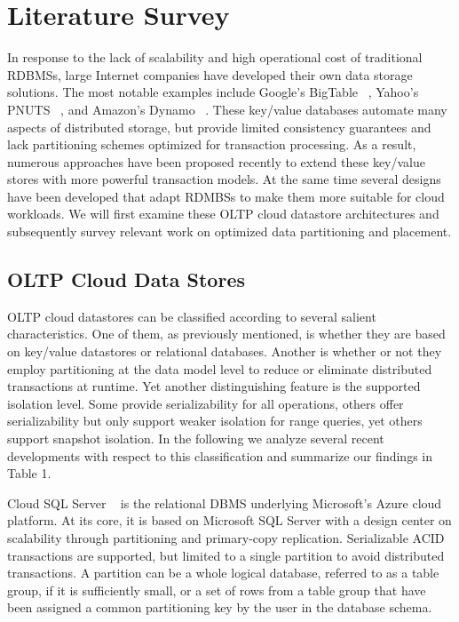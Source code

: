 \documentclass[10pt,final,journal]{IEEEtran}
\begin{document}
\section{Literature Survey}
In response to the lack of scalability and high operational cost of traditional RDBMSs, large Internet companies have developed their own data storage solutions. The most notable examples include Google's BigTable ~\cite{Chang:2006:BDS:1267308.1267323}, Yahoo's PNUTS ~\cite{Cooper:2008:PYH:1454159.1454167}, and Amazon's Dynamo ~\cite{DeCandia:2007:DAH:1323293.1294281}. These key/value databases automate many aspects of distributed storage, but provide limited consistency guarantees and lack partitioning schemes optimized for transaction processing. As a result, numerous approaches have been proposed recently  to extend these key/value stores with more powerful transaction models. At the same time several designs have been developed that adapt RDMBSs to make them more suitable for cloud workloads. We will first examine these OLTP cloud datastore architectures and subsequently survey relevant work on optimized data partitioning and placement.

\subsection{OLTP Cloud Data Stores}
OLTP cloud datastores can be classified according to several salient characteristics. One of them, as previously mentioned, is whether they are based on key/value datastores or relational databases. Another is whether or not they employ partitioning at the data model level to reduce or eliminate distributed transactions at runtime. Yet another distinguishing feature is the supported isolation level. Some provide serializability for all operations, others offer serializability but only support weaker isolation for range queries, yet others support snapshot isolation. In the following we analyze several recent developments with respect to this classification and summarize our findings in Table 1.

Cloud SQL Server ~\cite{Campbell:2010:ESF:1807167.1807280, Bernstein:2011:AMS:2004686.2005651} is the relational DBMS underlying Microsoft's Azure cloud platform. At its core, it is based on Microsoft SQL Server with a design center on scalability through partitioning and primary-copy replication. Serializable ACID transactions are supported, but limited to a single partition to avoid distributed transactions. A partition can be a whole logical database, referred to as a table group, if it is sufficiently small, or a set of rows from a table group that have been assigned a common partitioning key by the user in the database schema.
\end{document}
